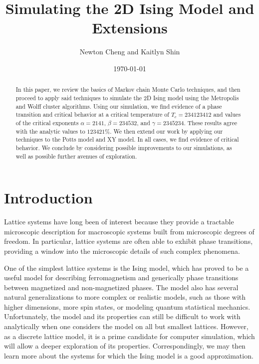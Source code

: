 \documentclass[twocolumn,aps,prl]{revtex4-1} %
\begin{document}
\title{Simulating the 2D Ising Model and Extensions}

\author{Newton Cheng and Kaitlyn Shin}

\date{\today}
\begin{abstract}
In this paper, we review the basics of Markov chain Monte Carlo techniques, and then proceed to apply said techniques to simulate the 2D Ising model using the Metropolis and Wolff cluster algorithms. Using our simulation, we find evidence of a phase transition and critical behavior at a critical temperature of $T_c = 234123412$ and values of the critical exponents $\alpha = 2141$, $\beta = 234532$, and $\gamma = 2345234$. These results agree with the analytic values to $123421\%$. We then extend our work by applying our techniques to the Potts model and XY model. In all cases, we find evidence of critical behavior. We conclude by considering possible improvements to our simulations, as well as possible further avenues of exploration.
\end{abstract}

\maketitle
\section{Introduction}
Lattice systems have long been of interest because they provide a tractable microscopic description for macroscopic systems built from microscopic degrees of freedom. In particular, lattice systems are often able to exhibit phase transitions, providing a window into the microscopic details of such complex phenomena.

One of the simplest lattice systems is the Ising model, which has proved to be a useful model for describing ferromagnetism and generically phase transitions between magnetized and non-magnetized phases. The model also has several natural generalizations to more complex or realistic models, such as those with higher dimensions, more spin states, or modeling quantum statistical mechanics. Unfortunately, the model and its properties can still be difficult to work with analytically when one considers the model on all but smallest lattices. However, as a discrete lattice model, it is a prime candidate for computer simulation, which will allow a deeper exploration of its properties. Correspondingly, we may then learn more about the systems for which the Ising model is a good approximation.
\end{document}
